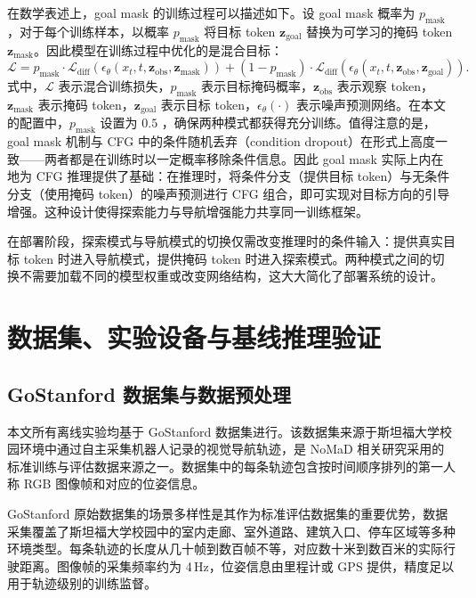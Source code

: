在数学表述上，goal mask 的训练过程可以描述如下。设 goal mask 概率为 $p_{\text{mask}}$，对于每个训练样本，以概率 $p_{\text{mask}}$ 将目标 token $\mathbf{z}_{\text{goal}}$ 替换为可学习的掩码 token $\mathbf{z}_{\text{mask}}$。因此模型在训练过程中优化的是混合目标：
\begin{equation}
\mathcal{L} = p_{\text{mask}} \cdot \mathcal{L}_{\text{diff}}(\epsilon_\theta(x_t, t, \mathbf{z}_{\text{obs}}, \mathbf{z}_{\text{mask}})) + (1 - p_{\text{mask}}) \cdot \mathcal{L}_{\text{diff}}(\epsilon_\theta(x_t, t, \mathbf{z}_{\text{obs}}, \mathbf{z}_{\text{goal}})).
\end{equation}
式中，$\mathcal{L}$ 表示混合训练损失，$p_{\text{mask}}$ 表示目标掩码概率，$\mathbf{z}_{\text{obs}}$ 表示观察 token，$\mathbf{z}_{\text{mask}}$ 表示掩码 token，$\mathbf{z}_{\text{goal}}$ 表示目标 token，$\epsilon_\theta(\cdot)$ 表示噪声预测网络。在本文的配置中，$p_{\text{mask}}$ 设置为 $0.5$ ，确保两种模式都获得充分训练。值得注意的是，goal mask 机制与 CFG 中的条件随机丢弃（condition dropout）在形式上高度一致——两者都是在训练时以一定概率移除条件信息。因此 goal mask 实际上内在地为 CFG 推理提供了基础：在推理时，将条件分支（提供目标 token）与无条件分支（使用掩码 token）的噪声预测进行 CFG 组合，即可实现对目标方向的引导增强。这种设计使得探索能力与导航增强能力共享同一训练框架。

在部署阶段，探索模式与导航模式的切换仅需改变推理时的条件输入：提供真实目标 token 时进入导航模式，提供掩码 token 时进入探索模式。两种模式之间的切换不需要加载不同的模型权重或改变网络结构，这大大简化了部署系统的设计。

\section{数据集、实验设备与基线推理验证}

\subsection{GoStanford 数据集与数据预处理}

本文所有离线实验均基于 GoStanford 数据集进行。该数据集来源于斯坦福大学校园环境中通过自主采集机器人记录的视觉导航轨迹，是 NoMaD 相关研究采用的标准训练与评估数据来源之一\cite{gnm2022,vint2023,nomad2023}。数据集中的每条轨迹包含按时间顺序排列的第一人称 RGB 图像帧和对应的位姿信息。

GoStanford 原始数据集的场景多样性是其作为标准评估数据集的重要优势，数据采集覆盖了斯坦福大学校园中的室内走廊、室外道路、建筑入口、停车区域等多种环境类型。每条轨迹的长度从几十帧到数百帧不等，对应数十米到数百米的实际行驶距离。图像帧的采集频率约为 4\,Hz，位姿信息由里程计或 GPS 提供，精度足以用于轨迹级别的训练监督。

